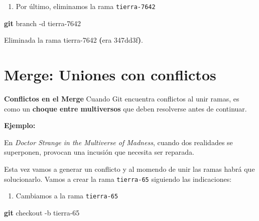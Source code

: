 \documentclass[
]{book}
\newenvironment{Shaded}{\begin{snugshade}}{\end{snugshade}}
\newcommand{\AttributeTok}[1]{\textcolor[rgb]{0.13,0.29,0.53}{#1}}
\newcommand{\BuiltInTok}[1]{#1}
\newcommand{\ErrorTok}[1]{\textcolor[rgb]{0.64,0.00,0.00}{\textbf{#1}}}
\newcommand{\ExtensionTok}[1]{#1}
\newcommand{\FunctionTok}[1]{\textcolor[rgb]{0.13,0.29,0.53}{\textbf{#1}}}
\newcommand{\KeywordTok}[1]{\textcolor[rgb]{0.13,0.29,0.53}{\textbf{#1}}}
\newcommand{\NormalTok}[1]{#1}
\providecommand{\tightlist}{%
  \setlength{\itemsep}{0pt}\setlength{\parskip}{0pt}}
\begin{document}
\begin{enumerate}
\def\labelenumi{\arabic{enumi}.}
\setcounter{enumi}{8}
\tightlist
\item
  Por último, eliminamos la rama \texttt{tierra-7642}
\end{enumerate}

\begin{Shaded}
\begin{Highlighting}[]
\FunctionTok{git}\NormalTok{ branch }\AttributeTok{{-}d}\NormalTok{ tierra{-}7642}
\end{Highlighting}
\end{Shaded}

\begin{Shaded}
\begin{Highlighting}[]
\ExtensionTok{Eliminada}\NormalTok{ la rama tierra{-}7642 }\ErrorTok{(}\ExtensionTok{era}\NormalTok{ 347dd3f}\KeywordTok{)}\BuiltInTok{.}
\end{Highlighting}
\end{Shaded}

\section{Merge: Uniones con conflictos}\label{merge-uniones-con-conflictos}

\textbf{Conflictos en el Merge}
Cuando Git encuentra conflictos al unir ramas, es como un \textbf{choque entre multiversos} que deben resolverse antes de continuar.

\textbf{Ejemplo:}

En \emph{Doctor Strange in the Multiverse of Madness}, cuando dos realidades se superponen, provocan una incusión que necesita ser reparada.

Esta vez vamos a generar un conflicto y al momendo de unir las ramas habrá que solucionarlo. Vamos a crear la rama \texttt{tierra-65} siguiendo las indicaciones:

\begin{enumerate}
\def\labelenumi{\arabic{enumi}.}
\tightlist
\item
  Cambiamos a la rama \texttt{tierra-65}
\end{enumerate}

\begin{Shaded}
\begin{Highlighting}[]
\FunctionTok{git}\NormalTok{ checkout }\AttributeTok{{-}b}\NormalTok{ tierra{-}65}
\end{Highlighting}
\end{Shaded}
\end{document}
